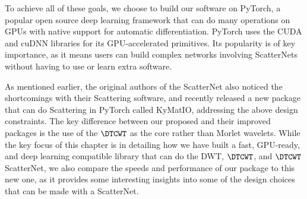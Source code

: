 To achieve all of these goals, we choose to build our software on PyTorch, 
a popular open source deep learning framework that can do many operations on
GPUs with native support for automatic differentiation. PyTorch uses the CUDA 
and cuDNN \cite{} libraries for its GPU-accelerated primitives. Its popularity
is of key importance, as it means users can build complex networks involving
ScatterNets without having to use or learn extra software.

As mentioned earlier, the original authors of the ScatterNet also noticed the
shortcomings with their Scattering software, and recently released a new package
that can do Scattering in PyTorch called KyMatIO\cite{andreux_kymatio:_2018}, addressing the
above design constraints. The key difference between our proposed and their
improved packages is the use of the $\DTCWT$ as the core rather than 
Morlet wavelets. While the key focus of this chapter is in detailing how we have
built a fast, GPU-ready, and deep learning compatible library that can do the
DWT, $\DTCWT$, and $\DTCWT$ ScatterNet, we also compare the speeds and performance
of our package to this new one, as it provides some interesting
insights into some of the design choices that can be made with a ScatterNet.
